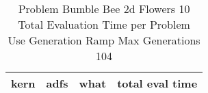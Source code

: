 \begin{table}[H]
\caption{Problem  Bumble Bee 2d  Flowers 10\\Total Evaluation Time per Problem \\ Use Generation Ramp  Max Generations 104\\}
\begin{center}
\scalebox{1.0} %
{
\begin{tabular}{lllr}
\hline
kern & adfs & what & total eval time \\
\hline


\end{tabular}
}
\end{center}
\end{table}

